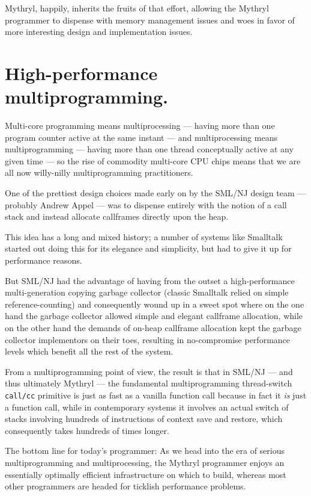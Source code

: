 Mythryl, happily, inherits the fruits of that effort, allowing the Mythryl 
programmer to dispense with memory management issues and woes in favor of 
more interesting design and implementation issues.

\section{High-performance multiprogramming.}

Multi-core programming means multiprocessing --- having more than 
one program counter active at the same instant --- and multiprocessing 
means multiprogramming --- having more than one thread conceptually 
active at any given time --- so the rise of commodity multi-core 
{\sc CPU} chips means that we are all now willy-nilly multiprogramming 
practitioners.

One of the prettiest design choices made early on by the {\sc SML/NJ} 
design team --- probably Andrew Appel --- was to dispense entirely with 
the notion of a call stack and instead allocate callframes directly 
upon the heap.

This idea has a long and mixed history;  a number of systems like 
Smalltalk started out doing this for its elegance and simplicity, 
but had to give it up for performance reasons.

But {\sc SML/NJ} had the advantage of having from the outset a high-performance 
multi-generation copying garbage collector (classic Smalltalk relied 
on simple reference-counting) and consequently wound up in a sweet 
spot where on the one hand the garbage collector allowed simple and 
elegant callframe allocation, while on the other hand the demands of 
on-heap callframe allocation kept the garbage collector implementors 
on their toes, resulting in no-compromise performance levels which 
benefit all the rest of the system.

From a multiprogramming point of view, the result is that in 
{\sc SML/NJ} --- and thus ultimately Mythryl --- the fundamental 
multiprogramming thread-switch {\tt call/cc} primitive is just as 
fast as a vanilla function call because in fact it {\em is} 
just a function call, while in contemporary systems it involves an 
actual switch of stacks involving hundreds of instructions of 
context save and restore, which consequently takes hundreds of 
times longer.

The bottom line for today's programmer:  As we head into the 
era of serious multiprogramming and multiprocessing, the 
Mythryl programmer enjoys an essentially optimally efficient 
infrastructure on which to build, whereas most other programmers 
are headed for ticklish performance problems.


